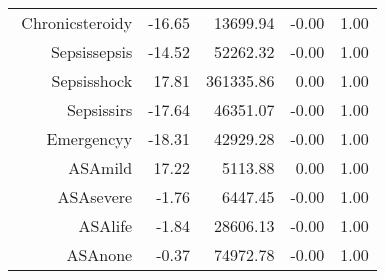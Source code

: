 \begin{tabular}{rrrrr}
$$  Chronic\-steroid\-y & -16.65 & 13699.94 & -0.00 & 1.00 \\ 
  Sepsis\-sepsis & -14.52 & 52262.32 & -0.00 & 1.00 \\ 
  Sepsis\-shock & 17.81 & 361335.86 & 0.00 & 1.00 \\ 
  Sepsis\-sirs & -17.64 & 46351.07 & -0.00 & 1.00 \\ 
  Emergency\-y & -18.31 & 42929.28 & -0.00 & 1.00 \\ 
  ASA\-mild & 17.22 & 5113.88 & 0.00 & 1.00 \\ 
  ASA\-severe & -1.76 & 6447.45 & -0.00 & 1.00 \\ 
  ASA\-life & -1.84 & 28606.13 & -0.00 & 1.00 \\ 
  ASA\-none & -0.37 & 74972.78 & -0.00 & 1.00 \\ 
   \hline
\end{tabular}

